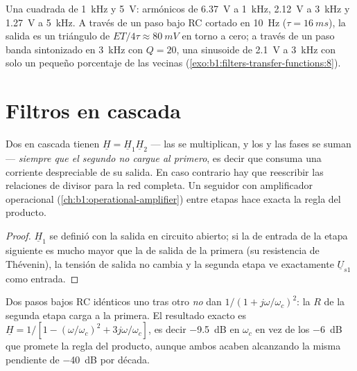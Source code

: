 \begin{example}[Cifras]\label{ex:b1:filters-transfer-functions:numbers}
Una  cuadrada de \qty{1}{kHz} y  \qty{5}{V}: armónicos de
\qty{6.37}{V} a \qty{1}{kHz}, \qty{2.12}{V} a \qty{3}{kHz} y
\qty{1.27}{V} a \qty{5}{kHz}. A través de un paso bajo RC cortado en
\qty{10}{Hz} ($\tau = \qty{16}{ms}$), la salida es un triángulo de
 $ET/4\tau \approx \qty{80}{mV}$ en torno a cero; a través de un
paso banda sintonizado en \qty{3}{kHz} con $Q = 20$, una sinusoide de
\qty{2.1}{V} a \qty{3}{kHz} con solo un pequeño porcentaje de las vecinas
(\cref{exo:b1:filters-transfer-functions:8}).
\end{example}

\section{Filtros en cascada}

\begin{proposition}\label{prop:b1:filters-transfer-functions:cascade}
Dos  en cascada tienen $\underline H = \underline H_1\underline H_2$
--- las  se multiplican, y los  y las fases se suman
--- \emph{siempre que el segundo no cargue al primero}, es decir que
consuma una corriente despreciable de su salida. En caso contrario hay que
reescribir las relaciones de divisor para la red completa. Un seguidor con
amplificador operacional (\cref{ch:b1:operational-amplifier}) entre etapas
hace exacta la regla del producto.
\end{proposition}

\begin{proof}
$\underline H_1$ se definió con la salida en circuito abierto; si la
 de entrada de la etapa siguiente es mucho mayor que la
 de salida de la primera (su resistencia de Thévenin), la
tensión de salida no cambia y la segunda etapa ve exactamente $\underline U_{s1}$ como entrada.
\end{proof}

\begin{example}\label{ex:b1:filters-transfer-functions:tworc}
Dos pasos bajos RC idénticos uno tras otro \emph{no} dan
$1/(1 + j\omega/\omega_c)^2$: la $R$ de la segunda etapa carga a la
primera. El resultado exacto es $\underline H = 1/[1 - (\omega/\omega_c)^2 +
3j\omega/\omega_c]$, es decir \qty{-9.5}{dB} en $\omega_c$ en vez de los
\qty{-6}{dB} que promete la regla del producto, aunque ambos acaben
alcanzando la misma pendiente de \qty{-40}{dB} por década.
\end{example}

